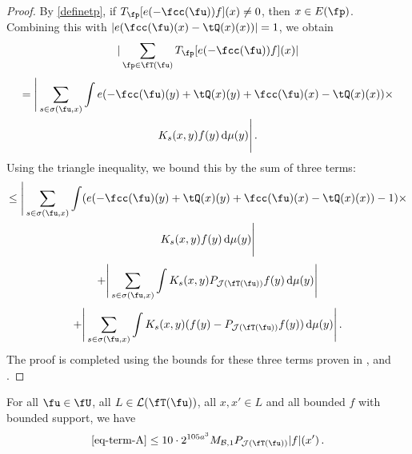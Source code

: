 \begin{proof}
    By \eqref{definetp}, if $T_{\fp}[ e(-\fcc(\fu))f](x) \ne 0$, then $x \in E(\fp)$. Combining this with $|e(\fcc(\fu)(x)-\tQ(x)(x))| = 1$, we obtain
    $$
        |\sum_{\fp \in \fT(\fu)} T_{\fp}[ e(-\fcc(\fu))f](x)|
    $$
    \begin{multline*}
        = \Bigg| \sum_{s \in \sigma(\fu, x)} \int e(-\fcc(\fu)(y) + \tQ(x)(y) + \fcc(\fu)(x) -\tQ(x)(x))\times\\
        K_s(x,y)f(y) \, \mathrm{d}\mu(y) \Bigg|\,.
    \end{multline*}
    Using the triangle inequality, we bound this by the sum of three terms:
    \begin{multline}
        \label{eq-term-A}
        \le \Bigg| \sum_{s \in \sigma(\fu, x)} \int (e(-\fcc(\fu)(y) + \tQ(x)(y) + \fcc(\fu)(x) -\tQ(x)(x))-1)\times\\
        K_s(x,y)f(y) \, \mathrm{d}\mu(y) \Bigg|
    \end{multline}
    \begin{equation}
        \label{eq-term-B}
        + \Bigg| \sum_{s \in \sigma(\fu, x)} \int K_s(x,y) P_{\mathcal{J}(\fT(\fu))} f(y) \, \mathrm{d}\mu(y) \Bigg|
    \end{equation}
    \begin{equation}
        \label{eq-term-C}
        + \Bigg| \sum_{s \in \sigma(\fu, x)} \int K_s(x,y) (f(y) - P_{\mathcal{J}(\fT(\fu))} f(y)) \, \mathrm{d}\mu(y) \Bigg|\,.
    \end{equation}
    The proof is completed using the bounds for these three terms proven in ,  and .
\end{proof}

\begin{lemma}
    \label{first-tree-pointwise}
    \leanok
    For all $\fu \in \fU$, all $L \in \mathcal{L}(\fT(\fu))$, all $x, x' \in L$ and all bounded $f$ with bounded support, we have
    $$
        \eqref{eq-term-A} \le 10 \cdot 2^{105a^3} M_{\mathcal{B}, 1}P_{\mathcal{J}(\fT(\fu))}|f|(x')\,.
    $$
\end{lemma}

